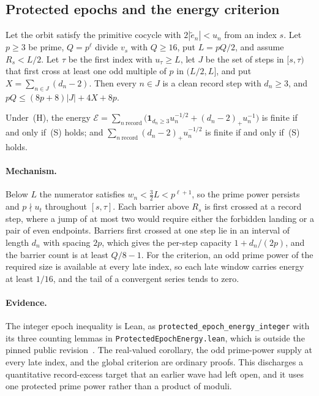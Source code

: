 \subsection{Protected epochs and the energy criterion}

\begin{theorem}\label{long243:res:epochenergy}
Let the orbit satisfy the primitive cocycle with $2|\tilde e_n|<u_n$ from an
index $s$.  Let $p\ge3$ be prime, $Q=p^{\ell}$ divide $v_s$ with $Q\ge16$, put
$L=pQ/2$, and assume $R_s<L/2$.  Let $\tau$ be the first index with $u_\tau\ge
L$, let $J$ be the set of steps in $[s,\tau)$ that first cross at least one odd
multiple of $p$ in $(L/2,L]$, and put $X=\sum_{n\in J}(d_n-2)$.  Then every
$n\in J$ is a clean record step with $d_n\ge3$, and
$pQ\le(8p+8)\lvert J\rvert+4X+8p$.
\end{theorem}

\begin{theorem}\label{long243:res:energycriterion}
Under~(H), the energy
$\mathcal E=\sum_{n\ \mathrm{record}}\bigl(\mathbf 1_{d_n\ge3}u_n^{-1/2}
+(d_n-2)_+u_n^{-1}\bigr)$ is finite if and only if~(S) holds; and
$\sum_{n\ \mathrm{record}}(d_n-2)_+u_n^{-1/2}$ is finite if and only if~(S)
holds.
\end{theorem}

\paragraph{Mechanism.}
Below $L$ the numerator satisfies $w_n<\tfrac32L<p^{\ell+1}$, so the prime power
persists and $p\nmid u_t$ throughout $[s,\tau]$.  Each barrier above $R_s$ is
first crossed at a record step, where a jump of at most two would require either
the forbidden landing or a pair of even endpoints.  Barriers first crossed at one
step lie in an interval of length $d_n$ with spacing $2p$, which gives the
per-step capacity $1+d_n/(2p)$, and the barrier count is at least $Q/8-1$.  For
the criterion, an odd prime power of the required size is available at every late
index, so each late window carries energy at least $1/16$, and the tail of a
convergent series tends to zero.

\paragraph{Evidence.}
The integer epoch inequality is Lean, as
\texttt{protected\_epoch\_energy\_integer} with its three counting lemmas in
\texttt{ProtectedEpochEnergy.lean}, which is outside the pinned public
revision~\commitshort.  The real-valued corollary, the odd prime-power supply at
every late index, and the global criterion are ordinary proofs.  This discharges
a quantitative record-excess target that an earlier wave had left open, and it
uses one protected prime power rather than a product of moduli.


